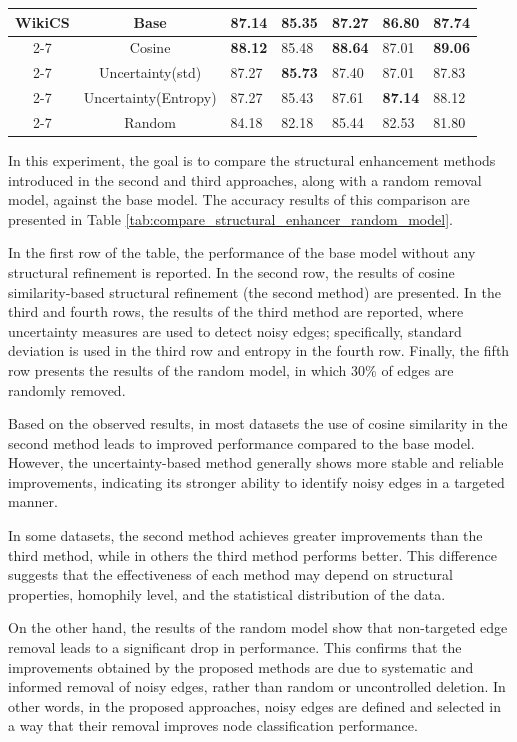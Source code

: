 \documentclass{article}
\begin{document}
\begin{table}[ht]
\begin{tabularx}{\linewidth}{c c || *{5}{X}}
\multirow{5}{*}{WikiCS}
 & Base
 & 87.14 & 85.35 & 87.27 & 86.80 & 87.74 \\
\cline{2-7}
 & Cosine
 & \textbf{88.12} & 85.48 & \textbf{88.64} & 87.01 & \textbf{89.06} \\
\cline{2-7}
 & Uncertainty(std)
 & 87.27 & \textbf{85.73} & 87.40 & 87.01 & 87.83 \\
\cline{2-7}
 & Uncertainty(Entropy)
 & 87.27 & 85.43 & 87.61 & \textbf{87.14} & 88.12 \\
\cline{2-7}
 & Random
 & 84.18 & 82.18 & 85.44 & 82.53 & 81.80 \\
\hline

\end{tabularx}
\end{table}

In this experiment, the goal is to compare the structural enhancement methods introduced in the second and third approaches,
along with a random removal model, against the base model.
The accuracy results of this comparison are presented in Table
\ref{tab:compare_structural_enhancer_random_model}.

In the first row of the table, the performance of the base model without any structural refinement is reported.
In the second row, the results of cosine similarity-based structural refinement (the second method) are presented.
In the third and fourth rows, the results of the third method are reported,
where uncertainty measures are used to detect noisy edges;
specifically, standard deviation is used in the third row
and entropy in the fourth row.
Finally, the fifth row presents the results of the random model,
in which 30\% of edges are randomly removed.

Based on the observed results,
in most datasets the use of cosine similarity in the second method
leads to improved performance compared to the base model.
However, the uncertainty-based method
generally shows more stable and reliable improvements,
indicating its stronger ability to identify noisy edges in a targeted manner.

In some datasets, the second method achieves greater improvements than the third method,
while in others the third method performs better.
This difference suggests that the effectiveness of each method
may depend on structural properties, homophily level,
and the statistical distribution of the data.

On the other hand, the results of the random model show that
non-targeted edge removal leads to a significant drop in performance.
This confirms that the improvements obtained by the proposed methods
are due to systematic and informed removal of noisy edges,
rather than random or uncontrolled deletion.
In other words, in the proposed approaches,
noisy edges are defined and selected in a way that their removal
improves node classification performance.
\end{document}

